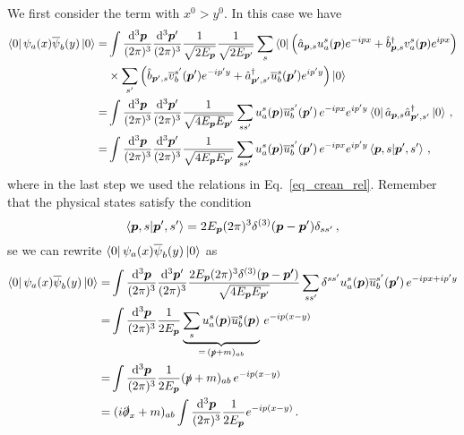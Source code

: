 \begin{sol}
\begin{equation}
    \end{equation}
    We first consider the term with $x^{0} > y^{0}$. In this case we have
    \begin{align}
        \bra{0}\psi_{a}(x)\sbar{\psi}_{b}(y) \ket{0} 
        = & \int \frac{\rmd^{3}\vp}{(2\pi)^{3}} \frac{\rmd^{3}\vp'}{(2\pi)^{3}} \frac{1}{\sqrt{2 \Ep}}\frac{1}{\sqrt{2 E_{\vp'}}} \sum_{s} \bra{0} \left(\ades_{\vp, s}u^{s}_{a}(\vp)e^{-ipx} + \bcon_{\vp,s}v^{s}_{a}(\vp)e^{ipx}\right) \notag\allowdisplaybreaks\\ 
        & \times \sum_{s'}\left(\bdes_{\vp', s}\sbar{v}^{s'}_{b}(\vp')e^{-ip'y} + \acon_{\vp', s'}\sbar{u}^{s}_{b}(\vp')e^{ip'y}\right)\ket{0} \notag\allowdisplaybreaks\\
        = & \int \frac{\rmd^{3}\vp}{(2\pi)^{3}} \frac{\rmd^{3}\vp'}{(2\pi)^{3}} \frac{1}{\sqrt{4 \Ep E_{\vp'}}} \sum_{s s'} u^{s}_{a}(\vp) \sbar{u}^{s'}_{b}(\vp') \, e^{-ipx} e^{ip'y} \bra{0} \ades_{\vp, s} \acon_{\vp', s'} \ket{0} \, , \notag\allowdisplaybreaks\\
        = & \int \frac{\rmd^{3}\vp}{(2\pi)^{3}} \frac{\rmd^{3}\vp'}{(2\pi)^{3}} \frac{1}{\sqrt{4 \Ep E_{\vp'}}} \sum_{s s'} u^{s}_{a}(\vp) \sbar{u}^{s'}_{b}(\vp') \, e^{-ipx} e^{ip'y} \braket{\vp,s}{\vp',s'} \, ,
    \end{align}
    where in the last step we used the relations in Eq.~\eqref{eq_crean_rel}. Remember that the physical states satisfy the condition
    \begin{equation}
        \braket{\boldsymbol{p},s}{\boldsymbol{p}',s'} 
        = 2E_{\boldsymbol{p}}(2\pi)^{3}\delta^{(3)} (\boldsymbol{p}-\boldsymbol{p}')\delta_{ss'} \, ,
    \end{equation}
    se we can rewrite $\bra{0} \psi_{a}(x)\overline{\psi}_{b}(y) \ket{0}$ as 
    \begin{align} \label{eq_norm_temp}
        \bra{0}\psi_{a}(x)\sbar{\psi}_{b}(y) \ket{0}
        = & \int \frac{\rmd^{3}\vp}{(2\pi)^{3}} \frac{\rmd^{3}\vp'}{(2\pi)^{3}} \frac{2\Ep (2\pi)^{3}\delta^{(3)}(\vp-\vpprime)}{\sqrt{4 \Ep E_{\vp'}}} \sum_{s s'} \delta^{ss'} u^{s}_{a}(\vp)\sbar{u}^{s'}_{b}(\vp') \, e^{-ipx+ip'y} \notag\allowdisplaybreaks \\
        = & \int \frac{\rmd^{3}\vp}{(2\pi)^{3}} \frac{1}{2\Ep} \underbrace{\sum_{s}u^{s}_{a}(\vp)\sbar{u}^{s}_{b}(\vp)}_{= \, (\slashed{p}+m)_{ab}} \, e^{-ip(x-y)} \notag\allowdisplaybreaks \\
        = & \int \frac{\rmd^{3}\vp}{(2\pi)^{3}} \frac{1}{2\Ep} (\slashed{p}+m)_{ab} \, e^{-ip(x-y)} \notag\allowdisplaybreaks \\
        = &\; (i\slashed{\partial}_{x} + m)_{ab}\int \frac{\rmd^{3}\vp}{(2\pi)^{3}}\frac{1}{2\Ep}e^{-ip(x-y)}\, . 
    \end{align}
    

\end{sol}

